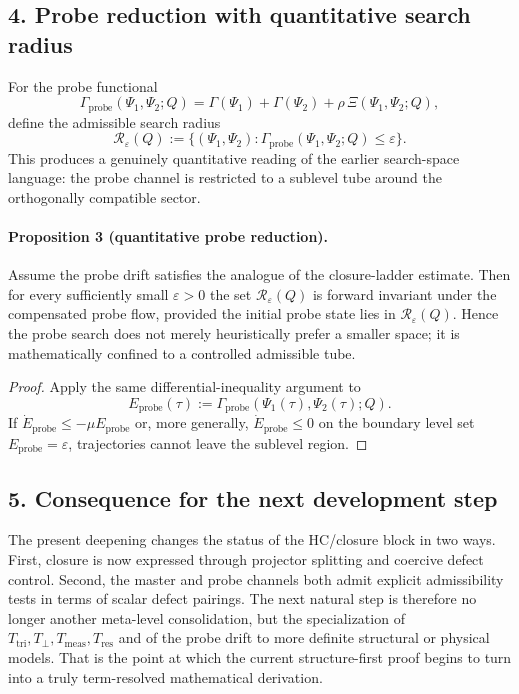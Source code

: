 \subsection*{4. Probe reduction with quantitative search radius}
For the probe functional
\[
\Gamma_{\mathrm{probe}}(\Psi_1,\Psi_2;Q)
=\Gamma(\Psi_1)+\Gamma(\Psi_2)+\rho\,\Xi(\Psi_1,\Psi_2;Q),
\]
define the admissible search radius
\[
\mathcal R_\varepsilon(Q):=
\{(\Psi_1,\Psi_2):\Gamma_{\mathrm{probe}}(\Psi_1,\Psi_2;Q)\le \varepsilon\}.
\]
This produces a genuinely quantitative reading of the earlier search-space
language: the probe channel is restricted to a sublevel tube around the
orthogonally compatible sector.

\paragraph{Proposition 3 (quantitative probe reduction).}
Assume the probe drift satisfies the analogue of the closure-ladder estimate.
Then for every sufficiently small $\varepsilon>0$ the set
$\mathcal R_\varepsilon(Q)$ is forward invariant under the compensated probe flow,
provided the initial probe state lies in $\mathcal R_\varepsilon(Q)$. Hence the
probe search does not merely heuristically prefer a smaller space; it is
mathematically confined to a controlled admissible tube.

\begin{proof}
Apply the same differential-inequality argument to
\[
E_{\mathrm{probe}}(\tau):=\Gamma_{\mathrm{probe}}(\Psi_1(\tau),\Psi_2(\tau);Q).
\]
If $\dot E_{\mathrm{probe}}\le -\mu E_{\mathrm{probe}}$ or, more generally, $\dot E_{\mathrm{probe}}\le 0$ on the boundary level set $E_{\mathrm{probe}}=\varepsilon$, trajectories cannot leave the sublevel region.
\end{proof}

\subsection*{5. Consequence for the next development step}
The present deepening changes the status of the HC/closure block in two ways.
First, closure is now expressed through projector splitting and coercive defect
control. Second, the master and probe channels both admit explicit admissibility
tests in terms of scalar defect pairings. The next natural step is therefore no
longer another meta-level consolidation, but the specialization of
$T_{\mathrm{tri}},T_{\perp},T_{\mathrm{meas}},T_{\mathrm{res}}$ and of the probe drift to
more definite structural or physical models. That is the point at which the
current structure-first proof begins to turn into a truly term-resolved
mathematical derivation.


